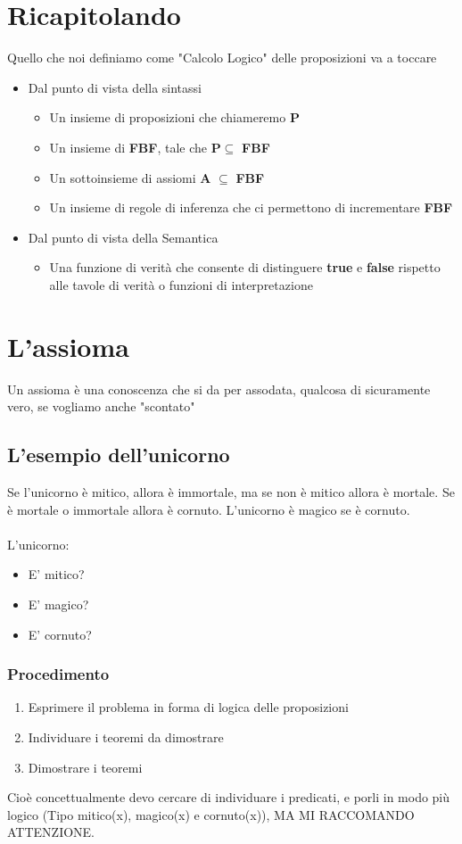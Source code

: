 \documentclass[12pt, a4paper, openany, oneside]{book}
\begin{document}
{\section{Ricapitolando} 
Quello che noi definiamo come "Calcolo Logico" delle proposizioni va a toccare
\begin{itemize}
	\item Dal punto di vista della sintassi
	\begin{itemize}
		\item Un insieme di proposizioni che chiameremo \textbf{P}
		\item Un insieme di \textbf{FBF}, tale che \textbf{P}$ \subseteq$ \textbf{FBF}
		\item Un sottoinsieme di assiomi \textbf{A} $ \subseteq $ \textbf{FBF}
		\item Un insieme di regole di inferenza che ci permettono di 
		incrementare \textbf{FBF}
	\end{itemize}
	\item Dal punto di vista della Semantica
	\begin{itemize}
		\item Una funzione di verità che consente di distinguere \textbf{true} e
		\textbf{false} rispetto alle tavole di verità o funzioni di interpretazione
	\end{itemize}
\end{itemize}
\section{L'assioma}
Un assioma è una conoscenza che si da per assodata, qualcosa di sicuramente vero,
se vogliamo anche "scontato" 
\subsection{L'esempio dell'unicorno}
Se l'unicorno è mitico, allora è immortale, ma se non è mitico allora è mortale.
Se è mortale o immortale allora è cornuto. L'unicorno è magico se è cornuto. \\ \\
L'unicorno:
\begin{itemize}
	\item E' mitico?
	\item E' magico?
	\item E' cornuto?
\end{itemize}
\subsubsection{Procedimento}
\begin{enumerate}
	\item Esprimere il problema in forma di logica delle proposizioni
	\item Individuare i teoremi da dimostrare
	\item Dimostrare i teoremi
\end{enumerate}
Cioè concettualmente devo cercare di individuare i predicati, e porli in modo
più logico (Tipo mitico(x), magico(x) e cornuto(x)), MA MI RACCOMANDO ATTENZIONE.
}
\end{document}
